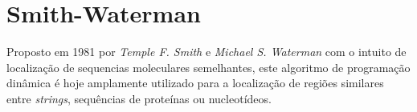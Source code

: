 \section{Smith-Waterman} %
\label{sec:smith_waterman}


Proposto em 1981 por \textit{Temple F. Smith} e \textit{Michael S. Waterman}\cite{smith1981identification} com o intuito de localização de sequencias moleculares semelhantes, este algoritmo de programação dinâmica é hoje amplamente utilizado para a localização de regiões similares entre \textit{strings}, sequências de proteínas ou nucleotídeos.

